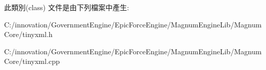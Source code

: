此類別(class) 文件是由下列檔案中產生\+:\begin{DoxyCompactItemize}
\item 
C\+:/innovation/\+Government\+Engine/\+Epic\+Force\+Engine/\+Magnum\+Engine\+Lib/\+Magnum\+Core/tinyxml.\+h\item 
C\+:/innovation/\+Government\+Engine/\+Epic\+Force\+Engine/\+Magnum\+Engine\+Lib/\+Magnum\+Core/tinyxml.\+cpp\end{DoxyCompactItemize}

